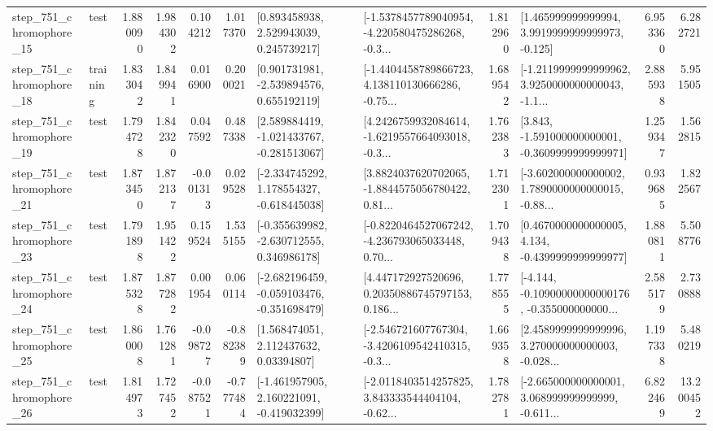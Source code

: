 \begin{tabular}{llrrrrllrlrr}
  step\_751\_chromophore\_15 &      test &      1.880090 &    1.984302 &      0.104212 &  1.017370 &     [0.893458938, 2.529943039, 0.245739217] &  [-1.5378457789040954, -4.220580475286268, -0.3... &       1.812960 &    [1.465999999999994, 3.9919999999999973, -0.125] &            6.953360 &          6.282721 \\
  step\_751\_chromophore\_18 &  training &      1.833042 &    1.849941 &      0.016900 &  0.200021 &    [0.901731981, -2.539894576, 0.655192119] &  [-1.4404458789866723, 4.138110130666286, -0.75... &       1.689542 &  [-1.2119999999999962, 3.9250000000000043, -1.1... &            2.885938 &          5.951505 \\
  step\_751\_chromophore\_19 &      test &      1.794728 &    1.842320 &      0.047592 &  0.487338 &   [2.589884419, -1.021433767, -0.281513067] &  [4.2426759932084614, -1.6219557664093018, -0.3... &       1.762383 &   [3.843, -1.591000000000001, -0.3609999999999971] &            1.259347 &          1.562815 \\
  step\_751\_chromophore\_21 &      test &      1.873450 &    1.872137 &     -0.001313 &  0.029528 &   [-2.334745292, 1.178554327, -0.618445038] &  [3.8824037620702065, -1.8844575056780422, 0.81... &       1.712301 &  [-3.602000000000002, 1.7890000000000015, -0.88... &            0.939685 &          1.822567 \\
  step\_751\_chromophore\_23 &      test &      1.791898 &    1.951422 &      0.159524 &  1.535155 &   [-0.355639982, -2.630712555, 0.346986178] &  [-0.8220464527067242, -4.236793065033448, 0.70... &       1.709438 &   [0.4670000000000005, 4.134, -0.4399999999999977] &            1.880811 &          5.508776 \\
  step\_751\_chromophore\_24 &      test &      1.875328 &    1.877282 &      0.001954 &  0.060114 &  [-2.682196459, -0.059103476, -0.351698479] &  [4.447172927520696, 0.20350886745797153, 0.186... &       1.778555 &  [-4.144, -0.10900000000000176, -0.355000000000... &            2.585179 &          2.730888 \\
  step\_751\_chromophore\_25 &      test &      1.860008 &    1.761281 &     -0.098727 & -0.882389 &      [1.568474051, 2.112437632, 0.03394807] &  [-2.546721607767304, -3.4206109542410315, -0.3... &       1.669358 &  [2.4589999999999996, 3.270000000000003, -0.028... &            1.197338 &          5.480219 \\
  step\_751\_chromophore\_26 &      test &      1.814973 &    1.727452 &     -0.087521 & -0.777484 &   [-1.461957905, 2.160221091, -0.419032399] &  [-2.0118403514257825, 3.843333544404104, -0.62... &       1.782781 &  [-2.665000000000001, 3.068999999999999, -0.611... &            6.822469 &         13.200452 \\

\end{tabular}
